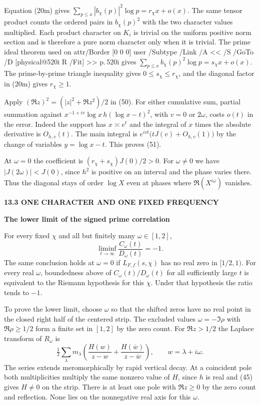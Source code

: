 \documentclass[11pt,letterpaper]{article}
\makeatletter
\newcommand{\rightmarktext}{}
\newcommand{\printfolio}{}
\newcommand{\leaf}[4]{\clearpage\gdef\printfolio{#1}\gdef\rightmarktext{#2}%
  {\small\sffamily\bfseries\color{ink}#3\par}\vspace{3pt}%
  {\LARGE\bfseries #4\par}\vspace{5pt}}
\newcommand{\MusicPDFPageRef}[1]{\pdfpageref\csname physical@#1\endcsname\space\space 0 R}
\newcommand{\pagelink}[2]{\leavevmode\pdfstartlink attr{/Border [0 0 0]} user{%
  /Subtype /Link /A << /S /GoTo /D [\MusicPDFPageRef{#1} /Fit] >>}%
  {\color{ink}#2}\pdfendlink}
\newcommand{\pg}[1]{\pagelink{#1}{p.\,#1}}
\makeatother
\begin{document}
Equation (20m) gives $\sum_{p\le x}|b_\chi(p)|^2\log p=r_\chi x+o(x)$.
The same tensor product counts the ordered pairs in $b_\chi(p)^2$
with the two character values multiplied. Each product character on
$K_i$ is trivial on the uniform positive norm section and is therefore
a pure norm character only when it is trivial. The prime ideal theorem
used on \pg{520i} gives
$\sum_{p\le x} b_\chi(p)^2\log p=s_\chi x+o(x)$.
The prime-by-prime triangle inequality gives $0\le s_\chi\le r_\chi$,
and the diagonal factor in (20m) gives $r_\chi\ge1$.

Apply $(\Re z)^2=(|z|^2+\Re z^2)/2$ in (50). For either cumulative
sum, partial summation against
$x^{-1+iv}\log x\,h(\log x-t)^2$, with $v=0$ or $2\omega$,
costs $o(t)$ in the error. Indeed the support has $x\asymp e^t$
and the integral of $x$ times the absolute derivative is $O_{h,v}(t)$.
The main integral is $e^{ivt}\big(tJ(v)+O_{h,v}(1)\big)$ by the
change of variables $y=\log x-t$. This proves (51).

At $\omega=0$ the coefficient is $(r_\chi+s_\chi)J(0)/2>0$.
For $\omega\ne0$ we have $|J(2\omega)|<J(0)$, since $h^2$ is
positive on an interval and the phase varies there. Thus the
diagonal stays of order $\log X$ even at phases where
$\Re(X^{i\omega})$ vanishes.

\leaf{522af}{The two limits}{13.3 \quad ONE CHARACTER AND ONE FIXED FREQUENCY}{The lower limit of the signed prime correlation}
For every fixed $\chi$ and all but finitely many $\omega\in[1,2]$,
\[
 \liminf_{t\to\infty}\frac{C_\omega(t)}{D_\omega(t)}=-1.
 \tag{52}
\]
The same conclusion holds at $\omega=0$ if $L_{F,f}(s,\chi)$ has no
real zero in $[1/2,1)$. For every real $\omega$, boundedness above of
$C_\omega(t)/D_\omega(t)$ for all sufficiently large $t$ is equivalent
to the Riemann hypothesis for this $\chi$. Under that hypothesis the
ratio tends to $-1$.

To prove the lower limit, choose $\omega$ so that the shifted zeros
have no real point in the closed right half of the centered strip.
The excluded values $\omega=-\Im\rho$ with $\Re\rho\ge1/2$
form a finite set in $[1,2]$ by the zero count.
For $\Re z>1/2$ the Laplace transform of $R_\omega$ is
\[
 \tfrac12\sum_\lambda m_\lambda
     \left(\frac{H(w)}{z-w}+\frac{H(\overline w)}{z-\overline w}\right),
                     \qquad w=\lambda+i\omega .
\]
The series extends meromorphically by rapid vertical decay. At a
coincident pole both multiplicities multiply the same nonzero value
of $H$, since $h$ is real and (45) gives $H\ne0$ on the strip.
There is at least one pole with $\Re z\ge0$ by the zero count and
reflection. None lies on the nonnegative real axis for this $\omega$.
\end{document}
